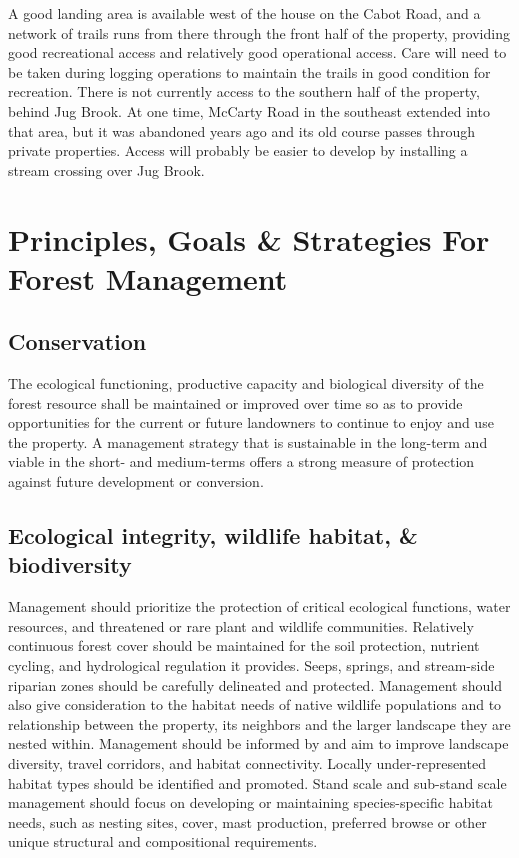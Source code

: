 \documentclass[]{tufte-handout}
\begin{document}
A good landing area is available west of the house on the Cabot Road,
and a network of trails runs from there through the front half of the
property, providing good recreational access and relatively good
operational access. Care will need to be taken during logging operations
to maintain the trails in good condition for recreation. There is not
currently access to the southern half of the property, behind Jug Brook.
At one time, McCarty Road in the southeast extended into that area, but
it was abandoned years ago and its old course passes through private
properties. Access will probably be easier to develop by installing a
stream crossing over Jug Brook.

\section{Principles, Goals \& Strategies For Forest
Management}\label{principles-goals-strategies-for-forest-management}

\subsection{Conservation}\label{conservation}

The ecological functioning, productive capacity and biological diversity
of the forest resource shall be maintained or improved over time so as
to provide opportunities for the current or future landowners to
continue to enjoy and use the property. A management strategy that is
sustainable in the long-term and viable in the short- and medium-terms
offers a strong measure of protection against future development or
conversion.

\subsection{Ecological integrity, wildlife habitat, \&
biodiversity}\label{ecological-integrity-wildlife-habitat-biodiversity}

Management should prioritize the protection of critical ecological
functions, water resources, and threatened or rare plant and wildlife
communities. Relatively continuous forest cover should be maintained for
the soil protection, nutrient cycling, and hydrological regulation it
provides. Seeps, springs, and stream-side riparian zones should be
carefully delineated and protected. Management should also give
consideration to the habitat needs of native wildlife populations and to
relationship between the property, its neighbors and the larger
landscape they are nested within. Management should be informed by and
aim to improve landscape diversity, travel corridors, and habitat
connectivity. Locally under-represented habitat types should be
identified and promoted. Stand scale and sub-stand scale management
should focus on developing or maintaining species-specific habitat
needs, such as nesting sites, cover, mast production, preferred browse
or other unique structural and compositional requirements.
\end{document}
